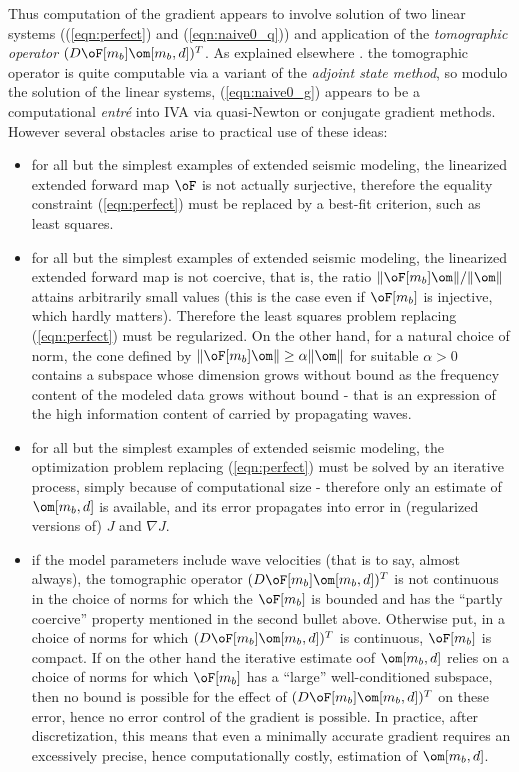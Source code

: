 Thus computation of the gradient appears to involve solution of two
linear systems ((\ref{eqn:perfect}) and (\ref{eqn:naive0_q})) and
application of the  {\em tomographic operator}
$(D\oF[m_b]\om[m_b,d])^T$. As explained elsewhere
\cite[]{KerSy:94,BiondiSava:04}. the tomographic operator is quite
computable via a variant of the {\em adjoint state method}, so modulo
the solution of the linear systems, (\ref{eqn:naive0_g}) appears to be
a computational {\em entr\'{e}} into IVA via quasi-Newton or conjugate
gradient methods. However several obstacles arise to practical use of
these ideas:
\begin{itemize}
\item for all but the simplest examples of extended seismic modeling, the linearized extended forward map $\oF$ is not actually surjective, therefore the equality constraint (\ref{eqn:perfect}) must be replaced by a best-fit criterion, such as least squares.
\item for all but the simplest examples of extended seismic modeling, the linearized extended forward map is not coercive, that is, the ratio $\|\oF[m_b]\om\|/\|\om\|$ attains arbitrarily small values (this is the case even if $\oF[m_b]$ is injective, which hardly matters). Therefore the least squares problem replacing (\ref{eqn:perfect}) must be regularized. On the other hand, for a natural choice of norm, the cone defined by $\|\oF[m_b]\om\| \ge \alpha \|\om\|$ for suitable $\alpha > 0$ contains a subspace whose dimension grows without bound as the frequency content of the modeled data grows without bound - that is an expression of the high information content of carried by propagating waves.
\item for all but the simplest examples of extended seismic modeling,
  the optimization problem replacing (\ref{eqn:perfect}) must be
  solved by an iterative process, simply because of computational size - therefore only an estimate of $\om[m_b,d]$ is available, and its error propagates into error in (regularized versions of) $J$ and $\nabla J$.
\item if the model parameters include wave velocities (that is to say,
almost always), the tomographic operator $(D\oF[m_b]\om[m_b,d])^T$ is not
continuous in the choice of norms for which the $\oF[m_b]$ is bounded
and has the ``partly coercive'' property mentioned in the second
bullet above. Otherwise put, in a choice of norms for which
$(D\oF[m_b]\om[m_b,d])^T$ is continuous, $\oF[m_b]$ is compact. If on the other hand
the iterative estimate oof $\om[m_b,d]$ relies on a choice of norms
for which $\oF[m_b]$ has a ``large'' well-conditioned subspace, then
no bound is possible for the effect of $(D\oF[m_b]\om[m_b,d])^T$ on
these error, hence no error control of the gradient is possible. In
practice, after discretization, this means that even a minimally accurate gradient requires
an excessively precise, hence computationally costly, estimation of $\om[m_b,d]$.
\end{itemize}

